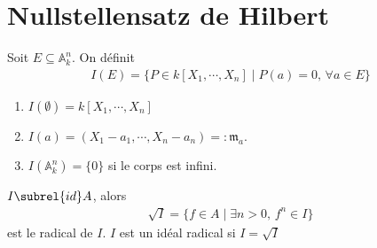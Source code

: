         \section{Nullstellensatz de Hilbert}
            \begin{defi}
                Soit $E \subseteq \mathbb{A}_k^n$. On définit
                \begin{align*}
                    I(E) = \{P \in k[X_1, \cdots, X_n] \mid P(a) = 0 ,\, \forall a \in E\}
                \end{align*}
            \end{defi}
            \begin{expl}
                \begin{enumerate}
                    \item $I(\emptyset) = k[X_1, \cdots, X_n]$
                    \item $I(a) = (X_1 - a_1, \cdots, X_n - a_n) =: \mathfrak{m}_a$. 
                    \item $I(\mathbb{A}_k^n) = \{0\}$ si le corps est infini.
                \end{enumerate}
            \end{expl}
            \begin{defi}
                $I \subrel{id} A$, alors 
                \begin{align*}
                    \sqrt{I} = \{f \in A \mid \exists n > 0,\, f^n \in I\}
                \end{align*}
                est le radical de $I$. $I$ est un idéal radical si $I = \sqrt{I}$
            \end{defi}
